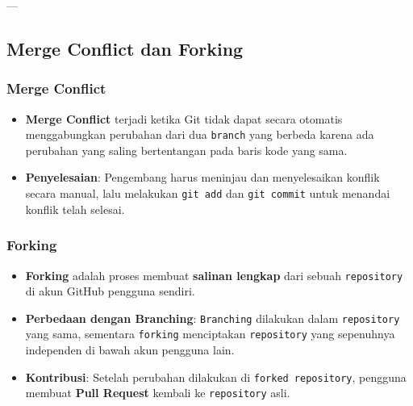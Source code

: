\documentclass{article}
\begin{document}
---

\subsection{Merge Conflict dan Forking}

\subsubsection{Merge Conflict}
\begin{itemize}
    \item \textbf{Merge Conflict} terjadi ketika Git tidak dapat secara otomatis menggabungkan perubahan dari dua \texttt{branch} yang berbeda karena ada perubahan yang saling bertentangan pada baris kode yang sama.
    \item \textbf{Penyelesaian}: Pengembang harus meninjau dan menyelesaikan konflik secara manual, lalu melakukan \texttt{git add} dan \texttt{git commit} untuk menandai konflik telah selesai.
\end{itemize}

\subsubsection{Forking}
\begin{itemize}
    \item \textbf{Forking} adalah proses membuat \textbf{salinan lengkap} dari sebuah \texttt{repository} di akun GitHub pengguna sendiri.
    \item \textbf{Perbedaan dengan Branching}: \texttt{Branching} dilakukan dalam \texttt{repository} yang sama, sementara \texttt{forking} menciptakan \texttt{repository} yang sepenuhnya independen di bawah akun pengguna lain.
    \item \textbf{Kontribusi}: Setelah perubahan dilakukan di \texttt{forked repository}, pengguna membuat \textbf{Pull Request} kembali ke \texttt{repository} asli.
\end{itemize}
\end{document}
